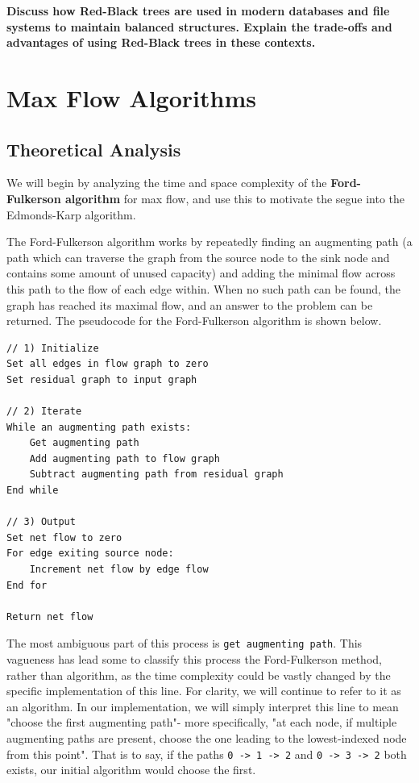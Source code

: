\documentclass[12pt]{amsart}
\begin{document}
    \newpage
    \textbf{Discuss how Red-Black trees are used in modern
    databases and file systems to maintain balanced structures.
    Explain the trade-offs and advantages of using Red-Black
    trees in these contexts.}

\section{Max Flow Algorithms}

\subsection{Theoretical Analysis}

    We will begin by analyzing the time and space complexity
    of the \textbf{Ford-Fulkerson algorithm} for max flow, and
    use this to motivate the segue into the Edmonds-Karp
    algorithm.

    The Ford-Fulkerson algorithm works by repeatedly finding an
    augmenting path (a path which can traverse the graph from
    the source node to the sink node and contains some amount of
    unused capacity) and adding the minimal flow across this
    path to the flow of each edge within. When no such path can
    be found, the graph has reached its maximal flow, and an
    answer to the problem can be returned. The pseudocode for
    the Ford-Fulkerson algorithm is shown below.

\begin{verbatim}
// 1) Initialize
Set all edges in flow graph to zero
Set residual graph to input graph

// 2) Iterate
While an augmenting path exists:
    Get augmenting path
    Add augmenting path to flow graph
    Subtract augmenting path from residual graph
End while

// 3) Output
Set net flow to zero
For edge exiting source node:
    Increment net flow by edge flow
End for

Return net flow
\end{verbatim}

    The most ambiguous part of this process is
    \verb|get augmenting path|. This vagueness has lead some to
    classify this process the Ford-Fulkerson method, rather than
    algorithm, as the time complexity could be vastly changed by
    the specific implementation of this line. For clarity, we
    will continue to refer to it as an algorithm. In our
    implementation, we will simply interpret this line to mean
    "choose the first augmenting path"- more specifically, 
    "at each node, if multiple augmenting paths are present,
    choose the one leading to the lowest-indexed node from this
    point". That is to say, if the paths \verb|0 -> 1 -> 2| and
    \verb|0 -> 3 -> 2| both exists, our initial algorithm would
    choose the first.
\end{document}
